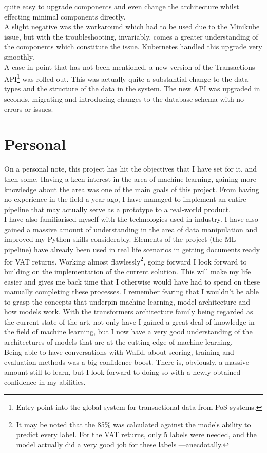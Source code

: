 quite easy to upgrade components and even change the architecture whilst effecting minimal components directly.\\
A slight negative was the workaround which had to be used due to the Minikube issue, but with the 
troubleshooting, invariably, comes a greater understanding of the components which constitute the issue. 
Kubernetes handled this upgrade very smoothly. 
\\
A case in point that has not been mentioned, a new version of the Transactions API\footnote{Entry point into the 
global system for transactional data from PoS systems.} was rolled out. This was actually quite a substantial change to 
the data types and the structure of the data in the system. The new API was upgraded in seconds, migrating 
and introducing changes to the database schema with no errors or issues.


\section{Personal}
On a personal note, this project has hit the objectives that I have set for it, and then some. Having a keen interest in the area 
of machine learning, gaining more knowledge about the area was one of the main goals of this project. From having 
no experience in the field a year ago, I have managed to implement an entire pipeline that may actually serve as a 
prototype to a real-world product.\\ 
I have also familiarised myself with the technologies used in industry. I have also gained a massive amount of 
understanding in the area of data manipulation and improved my Python skills considerably. 
\bigbreak
Elements of the project (the ML pipeline) have already been used in real life scenarios in getting documents ready for VAT returns. Working 
almost flawlessly\footnote{It may be noted that the 85\% \FO was calculated against the models ability to predict every label.
For the VAT returns, only 5 labels were needed, and the model actually did a very good job for these labels ---anecdotally.}, going forward I look 
forward to building on the implementation of the current solution. This will make my life easier and gives me back time 
that I otherwise would have had to spend on these manually completing these processes.
\label{sec:personal}
\bigbreak
I remember fearing that I wouldn't be able to grasp the concepts that underpin machine learning, model architecture and 
how models work. With the transformers architecture family being regarded as the current state-of-the-art, 
not only have I gained a great deal of knowledge in the field of machine learning, but I now have a very good understanding 
of the architectures of models that are at the cutting edge of machine learning.\\
Being able to have conversations with Walid, about scoring, training and evaluation methods was a big confidence 
boost. There is, obviously, 
a massive amount still to learn, but I look forward to doing so with a newly obtained confidence in my abilities. 
